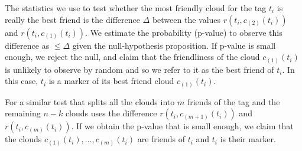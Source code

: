 \documentclass{llncs}
\begin{document}
The statistics we use to test whether the most friendly cloud for the tag $t_i$ is really the best friend is the difference $\Delta$ between the values $r(t_i,c_{(2)}(t_i))$ and $r(t_i,c_{(1)}(t_i))$. We estimate the probability (p-value) to observe this difference as $\leq \Delta$ given the null-hypothesis proposition. If p-value is small enough, we reject the null, and claim that the friendliness of the cloud $c_{(1)}(t_i)$ is unlikely to observe by random and so we refer to it as the best friend of $t_i$. In this case, $t_i$ is a marker of its best friend cloud $c_{(1)}(t_i)$.

For a similar test that splits all the clouds into $m$ friends of the tag and the remaining $n-k$ clouds uses the difference  $r(t_i,c_{(m+1)}(t_i))$ and $r(t_i,c_{(m)}(t_i))$. If we obtain the p-value that is small enough, we claim that the clouds $c_{(1)}(t_i), \dots, c_{(m)}(t_i)$ are friends of $t_i$ and $t_i$ is their marker.





\end{document}
